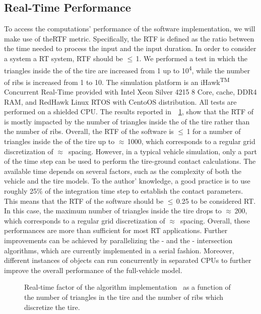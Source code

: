 \subsection{Real-Time Performance}
\label{app2:sec:performance}

To access the computations' performance of the \Enve{} \cpp{} software implementation, we will make use of the\ac{RTF} metric. Specifically, the \ac{RTF} is defined as the ratio between the time needed to process the input and the input duration. In order to consider a system a \ac{RT} system, \ac{RTF} should be $\leq$\,1. We performed a test in which the triangles inside the \Aabb{} of the tire are increased from 1 up to 10\textsuperscript{4}, while the number of ribs is increased from 1 to 10. The simulation platform is an iHawk\textsuperscript{TM} Concurrent Real-Time provided with  Intel Xeon Silver 4215 8 Core,  cache,  DDR4 \ac{RAM}, and  RedHawk Linux RTOS with CentoOS distribution. All tests are performed on a shielded CPU. The results reported in~\figurename{}~\ref{app2:fig:rtf_enve}, show that the \ac{RTF} of \Enve{} is mostly impacted by the number of triangles inside the \Aabb{} of the tire rather than the number of ribs. Overall, the \ac{RTF} of the software is $\leq$\,1 for a number of triangles inside the \Aabb{} of the tire up to $\approx$\,1000, which corresponds to a regular grid discretization of $\approx$\, spacing. However, in a typical vehicle simulation, only a part of the time step can be used to perform the tire-ground contact calculations. The available time depends on several factors, such as the complexity of both the vehicle and the tire models. To the author' knowledge, a good practice is to use roughly 25\% of the integration time step to establish the contact parameters. This means that the \ac{RTF} of the software should be $\leq$\,0.25 to be considered \ac{RT}. In this case, the maximum number of triangles inside the tire \Aabb{} drops to $\approx$\,200, which corresponds to a regular grid discretization of $\approx$\, spacing. Overall, these performances are more than sufficient for most \ac{RT} applications. Further improvements can be achieved by parallelizing the \AabbTree{}-\Aabb{} and the \Rib{}-\TriangleGround{} intersection algorithms, which are currently implemented in a serial fashion. Moreover, different instances of \Enve{} objects can run concurrently in separated CPUs to further improve the overall performance of the full-vehicle model.

\begin{figure}[!htp]
  \centering
  \caption{Real-time factor of the \Enve{} algorithm \cpp{} implementation~\cite{enve} as a function of the number of triangles in the tire \Aabb{} and the number of ribs which discretize the tire.}
  \label{app2:fig:rtf_enve}
\end{figure}


